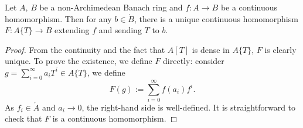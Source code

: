 \begin{proposition}\label{prop-Tateunivprop}
    Let $A$, $B$ be a non-Archimedean Banach ring and $f:A\rightarrow B$ be a continuous homomorphism. Then for any $b\in \mathring{B}$, there is a unique continuous homomorphism $F:A\{T\}\rightarrow B$ extending $f$ and sending $T$ to $b$. 
\end{proposition}
\begin{proof}
    From the continuity and the fact that $A[T]$ is dense in $A\{T\}$, $F$ is clearly unique. To prove the existence, we define $F$ directly: consider $g=\sum_{i=0}^{\infty}a_i T^i\in A\{T\}$, we define
    \[
        F(g):=\sum_{i=0}^{\infty} f(a_i)f^i.      
    \]
    As $f_i\in \mathring{A}$ and $a_i\to 0$, the right-hand side is well-defined. It is straightforward to check that $F$ is a continuous homomorphism.
\end{proof}

